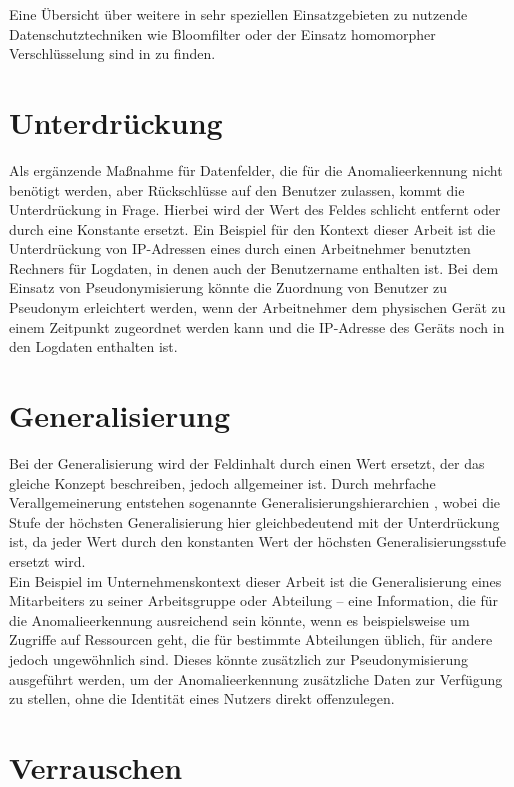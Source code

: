 Eine Übersicht über weitere in sehr speziellen Einsatzgebieten zu nutzende Datenschutztechniken wie Bloomfilter oder der Einsatz homomorpher Verschlüsselung sind in \cite{niksefat2017privacy} zu finden.

\section{Unterdrückung} %

Als ergänzende Maßnahme für Datenfelder, die für die Anomalieerkennung nicht benötigt werden, aber Rückschlüsse auf den Benutzer zulassen, kommt die Unterdrückung in Frage. Hierbei wird der Wert des Feldes schlicht entfernt oder durch eine Konstante ersetzt. Ein Beispiel für den Kontext dieser Arbeit ist die Unterdrückung von IP-Adressen eines durch einen Arbeitnehmer benutzten Rechners für Logdaten, in denen auch der Benutzername enthalten ist. Bei dem Einsatz von Pseudonymisierung könnte die Zuordnung von Benutzer zu Pseudonym erleichtert werden, wenn der Arbeitnehmer dem physischen Gerät zu einem Zeitpunkt zugeordnet werden kann und die IP-Adresse des Geräts noch in den Logdaten enthalten ist.

\section{Generalisierung}

Bei der Generalisierung wird der Feldinhalt durch einen Wert ersetzt, der das gleiche Konzept beschreiben, jedoch allgemeiner ist. Durch mehrfache Verallgemeinerung entstehen sogenannte Generalisierungshierarchien , wobei die Stufe der höchsten Generalisierung hier gleichbedeutend mit der Unterdrückung ist, da jeder Wert durch den konstanten Wert der höchsten Generalisierungsstufe ersetzt wird.\\
Ein Beispiel im Unternehmenskontext dieser Arbeit ist die Generalisierung eines Mitarbeiters zu seiner Arbeitsgruppe oder Abteilung -- eine Information, die für die Anomalieerkennung ausreichend sein könnte, wenn es beispielsweise um Zugriffe auf Ressourcen geht, die für bestimmte Abteilungen üblich, für andere jedoch ungewöhnlich sind. Dieses könnte zusätzlich zur Pseudonymisierung ausgeführt werden, um der Anomalieerkennung zusätzliche Daten zur Verfügung zu stellen, ohne die Identität eines Nutzers direkt offenzulegen.

\section{Verrauschen} %


